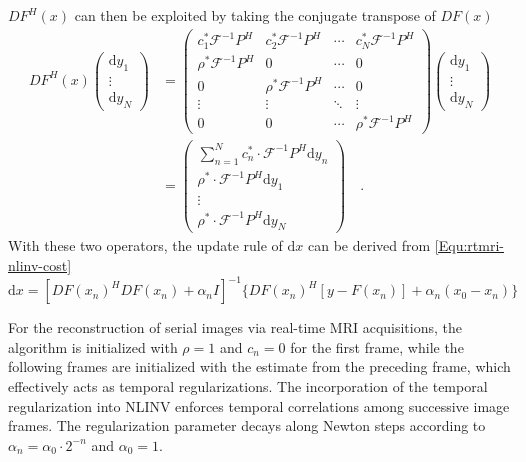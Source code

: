 $DF^{H} (x)$ can then be exploited by taking the conjugate transpose of $DF(x)$
\begin{align}
  DF^{H} (x) \begin{pmatrix}
    \text{d} y_1 \\
    \vdots \\
    \text{d} y_N
  \end{pmatrix}
  &= \begin{pmatrix}
    c_1^* \mathcal{F}^{-1} P^H & c_2^* \mathcal{F}^{-1} P^H & \cdots & c_N^* \mathcal{F}^{-1} P^H \\
    \rho^* \mathcal{F}^{-1} P^H & 0 & \cdots & 0 \\
    0 & \rho^* \mathcal{F}^{-1} P^H & \cdots & 0 \\
    \vdots & \vdots & \ddots & \vdots \\
    0 & 0 & \cdots & \rho^* \mathcal{F}^{-1} P^H
  \end{pmatrix} \begin{pmatrix}
    \text{d} y_1 \\
    \vdots \\
    \text{d} y_N
  \end{pmatrix} \nonumber \\
  &= \begin{pmatrix}
    \sum_{n=1}^{N} c_n^* \cdot \mathcal{F}^{-1} P^H \text{d} y_n \\
    \rho^* \cdot \mathcal{F}^{-1} P^H \text{d} y_1 \\
    \vdots \\
    \rho^* \cdot \mathcal{F}^{-1} P^H \text{d} y_N 
  \end{pmatrix} \quad . \label{Equ:rtmri-nlinv-adj}
\end{align}
With these two operators, the update rule of $\text{d}x$ can be derived from \cref{Equ:rtmri-nlinv-cost}
\begin{equation} \label{Equ:rtmri-dx-sol}
  \text{d}x = [DF(x_n)^H DF(x_n) + \alpha_n I]^{-1} \{ DF(x_n)^H [y-F(x_n)] + \alpha_n (x_0 - x_n) \}
\end{equation}

For the reconstruction of serial images via real-time MRI acquisitions, the algorithm is initialized with $\rho=1$ and $c_n = 0$ for the first frame, while the following frames are initialized with the estimate from the preceding frame, which effectively acts as temporal regularizations. The incorporation of the temporal regularization into NLINV enforces temporal correlations among successive image frames. The regularization parameter decays along Newton steps according to $\alpha_n = \alpha_0 \cdot 2^{-n}$ and $\alpha_0 = 1$.

